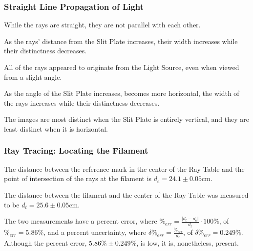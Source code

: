 \documentclass[12pt]{article}
\begin{document}
\subsubsection{Straight Line Propagation of Light}

\subsubsubsection{}

While the rays are straight, they are not parallel with each other.

\subsubsubsection{}

As the rays' distance from the Slit Plate increases, their width increases while
their distinctness decreases.

\subsubsubsection{}

All of the rays appeared to originate from the Light Source, even when viewed
from a slight angle.

\subsubsubsection{}

As the angle of the Slit Plate increases, becomes more horizontal, the width of
the rays increases while their distinctness decreases.

\subsubsubsection{}

The images are most distinct when the Slit Plate is entirely vertical, and
they are least distinct when it is horizontal.

\subsubsection{Ray Tracing: Locating the Filament}

\subsubsubsection{}

The distance between the reference mark in the center of the Ray Table and the
point of intersection of the rays at the filament
is \(d_e = 24.1 \pm 0.05 \si{\centi\meter}\).

\subsubsubsection{}

The distance between the filament and the center of the Ray Table was measured
to be \(d_t = 25.6 \pm 0.05 \si{\centi\meter}\).

\subsubsubsection{}

The two measurements have a percent error, where
\(\%_{err} = \frac{|d_t - d_e|}{d_t} \cdot 100\%\), of \(\%_{err} = 5.86\%\), and a percent
uncertainty, where \(\delta \%_{err} = \frac{\%_{err}}{d_e}\), of \(\delta
\%_{err} = 0.249 \%\). Although the percent error, \(5.86\% \pm 0.249\%\), is low,
it is, nonetheless, present.


\end{document}
